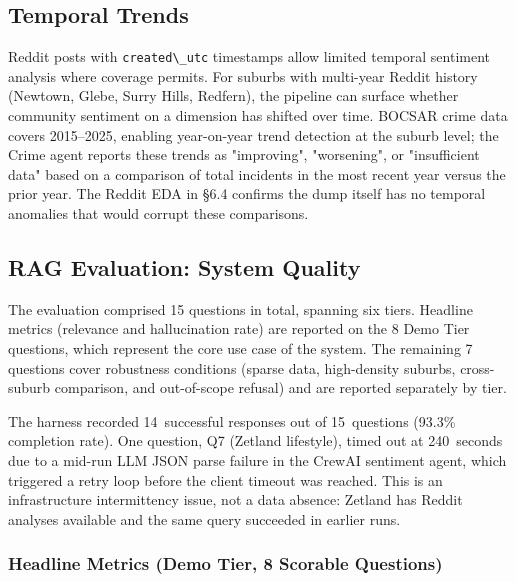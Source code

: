 \documentclass[11pt,a4paper]{article}
\newcommand{\passthrough}[1]{#1}
\begin{document}
\subsection{Temporal Trends}\label{65-temporal-trends}

Reddit posts with \passthrough{\lstinline!created\_utc!} timestamps allow limited temporal sentiment analysis where coverage permits. For suburbs with multi-year Reddit history (Newtown, Glebe, Surry Hills, Redfern), the pipeline can surface whether community sentiment on a dimension has shifted over time. BOCSAR crime data covers 2015--2025, enabling year-on-year trend detection at the suburb level; the Crime agent reports these trends as "improving", "worsening", or "insufficient data" based on a comparison of total incidents in the most recent year versus the prior year. The Reddit EDA in §6.4 confirms the dump itself has no temporal anomalies that would corrupt these comparisons.

\subsection{RAG Evaluation: System Quality}\label{66-rag-evaluation}

The evaluation comprised 15 questions in total, spanning six tiers. Headline metrics (relevance and hallucination rate) are reported on the 8 Demo Tier questions, which represent the core use case of the system. The remaining 7 questions cover robustness conditions (sparse data, high-density suburbs, cross-suburb comparison, and out-of-scope refusal) and are reported separately by tier.

The harness recorded 14~successful responses out of 15~questions (93.3\% completion rate). One question, Q7 (Zetland lifestyle), timed out at 240~seconds due to a mid-run LLM JSON parse failure in the CrewAI sentiment agent, which triggered a retry loop before the client timeout was reached. This is an infrastructure intermittency issue, not a data absence: Zetland has Reddit analyses available and the same query succeeded in earlier runs.

\subsubsection{Headline Metrics (Demo Tier, 8 Scorable Questions)}
\end{document}
